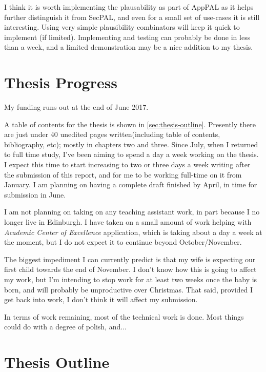 \documentclass[a4paper]{scrartcl}
\begin{document}
I think it is worth implementing the plausability as part of AppPAL as it helps
further distinguish it from SecPAL, and even for a small set of use-cases it is
still interesting.  Using very simple plausibility combinators will keep it
quick to implement (if limited).  Implementing and testing can probably be done
in less than a week, and a limited demonstration may be a nice addition to my thesis.

\section{Thesis Progress}
\label{sec:thesis}

My funding runs out at the end of June 2017.

A table of contents for the thesis is shown in \autoref{sec:thesis-outline}.
Presently there are just under 40 unedited pages written(including table of contents,
bibliography, etc); mostly in chapters two and three. Since July, when I
returned to full time study, I've been aiming to spend a day a week working on
the thesis.  I expect this time to start increasing to two or three days a week
writing after the submission of this report, and for me to be working full-time
on it from January.  I am planning on having a complete draft finished by April,
in time for submission in June.

I am not planning on taking on any teaching assistant work, in part because I
no longer live in Edinburgh.  I have taken on a small amount of work helping
with \emph{Academic Center of Excellence} application, which is taking about a
day a week at the moment, but I do not expect it to continue beyond
October/November.

The biggest impediment I can currently predict is that my wife is expecting our
first child towards the end of November.  I don't know how this is going to
affect my work, but I'm intending to stop work for at least two weeks once the
baby is born, and will probably be unproductive over Christmas.  That said,
provided I get back into work, I don't think it will affect my submission.

In terms of work remaining, most of the technical work is done.  Most things
could do with a degree of polish, and... 



 
\pagebreak
\appendix
\section{Thesis Outline}
\label{sec:thesis-outline}
\end{document}
